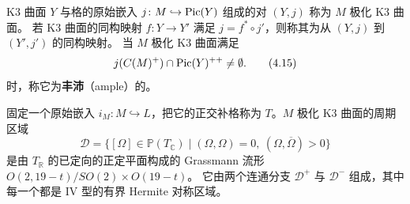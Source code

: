 

\begin{definition}[Dolgachev {[Dol96]}]
K3 曲面 $Y$ 与格的原始嵌入 $j\colon M\hookrightarrow\operatorname{Pic}(Y)$ 组成的对 $(Y,j)$ 称为 $M$ 极化 K3 曲面。
若 K3 曲面的同构映射 $f\colon Y\to Y'$ 满足 $j=f^{*}\circ j'$，则称其为从 $(Y,j)$ 到 $(Y',j')$ 的同构映射。
当 $M$ 极化 K3 曲面满足
\begin{equation}
  j(C(M)^{+})\cap\operatorname{Pic}(Y)^{++}\neq\emptyset. \tag{4.15}
\end{equation}
时，称它为\textbf{丰沛}（ample）的。
\end{definition}

固定一个原始嵌入 $i_M\colon M\hookrightarrow L$，把它的正交补格称为 $T$。$M$ 极化 K3 曲面的周期区域
\begin{equation}
  \mathcal{D}=\{[\Omega]\in\mathbb{P}(T_{\mathbb{C}})\mid(\Omega,\Omega)=0,\ (\Omega,\overline{\Omega})>0\} \tag{4.16}
\end{equation}
是由 $T_{\mathbb{R}}$ 的已定向的正定平面构成的 Grassmann 流形 $O(2,19-t)/SO(2)\times O(19-t)$。
它由两个连通分支 $\mathcal{D}^{+}$ 与 $\mathcal{D}^{-}$ 组成，其中每一个都是 IV 型的有界 Hermite 对称区域。

